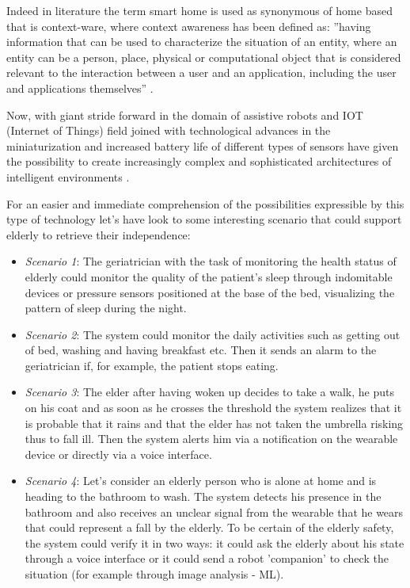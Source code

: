 \documentclass{thesisreport}
\begin{document}
 Indeed in literature the term smart home is used as synonymous of home based that is context-ware, where context awareness has been defined as: ”having information that can be used to characterize the situation of an entity, where an entity can be a person, place, physical or computational object that is considered relevant to the interaction between a user and an application, including the user and applications themselves” \cite{abowd1999towards}. 

 Now, with giant stride forward in the domain of assistive robots and IOT (Internet of Things) field joined with technological advances in the miniaturization and increased battery life of different types of sensors have given the possibility to create increasingly complex and sophisticated architectures of intelligent environments \cite{phdthesis} \cite{nakashima2009handbook}.
 
 For an easier and immediate comprehension of the possibilities expressible by this type of technology let's have look to some interesting scenario that could support elderly to retrieve their independence:
 \begin{itemize}
     \item \textit{Scenario 1}: The geriatrician with the task of monitoring the health status of elderly could monitor the quality of the patient's sleep through indomitable devices or pressure sensors positioned at the base of the bed, visualizing the pattern of sleep during the night.
     \item \textit{Scenario 2}: The system could monitor the daily activities such as getting out of bed, washing and having breakfast etc. Then it sends an alarm to the geriatrician if, for example, the patient stops eating.
     \item \textit{Scenario 3}: The elder after having woken up decides to take a walk, he puts on his coat and as soon as he crosses the threshold the system realizes that it is probable that it rains and that the elder has not taken the umbrella risking thus to fall ill. Then the system alerts him via a notification on the wearable device or directly via a voice interface.
     \item \textit{Scenario 4}: Let's consider an elderly person who is alone at home  and is heading to the bathroom to wash. The system detects his presence in the bathroom and also receives an unclear signal from the wearable that he wears that could represent a fall by the elderly. To be certain of the elderly safety, the system could verify it  in two ways: it could ask the elderly about his state through a voice interface or it could send a robot 'companion' to check the situation (for example through image analysis - ML).
 \end{itemize}
 
\end{document}
